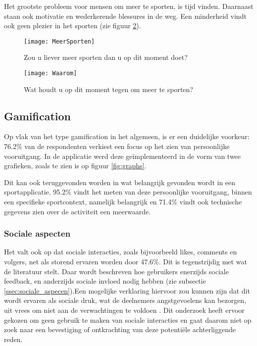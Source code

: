 Het grootste probleem voor mensen om meer te sporten, is tijd vinden. Daarnaast staan ook motivatie en wederkerende blessures in de weg. Een minderheid vindt ook geen plezier in het sporten (zie figuur \ref{fig:waarom}).

\begin{figure}[h]
    \caption[Zou u liever meer sporten dan u op dit moment doet?]{Zou u liever meer sporten dan u op dit moment doet?}
    \texttt{[image: MeerSporten]}
    \label{fig:meerBewegen}
\end{figure}

\begin{figure}[h]
    \caption[Wat houdt u op dit moment tegen om meer te sporten?]{Wat houdt u op dit moment tegen om meer te sporten?}
    \texttt{[image: Waarom]}
    \label{fig:waarom}
\end{figure}

\subsection{Gamification}

Op vlak van het type gamification in het algemeen, is er een duidelijke voorkeur: 76.2\% van de respondenten verkiest een focus op het zien van persoonlijke vooruitgang. In de applicatie werd deze geïmplementeerd in de vorm van twee grafieken, zoals te zien is op figuur \ref{fig:graphs}.

Dit kan ook teruggevonden worden in wat belangrijk gevonden wordt in een sportapplicatie. 95.2\% vindt het meten van deze persoonlijke vooruitgang, binnen een specifieke sportcontext, namelijk belangrijk en 71.4\% vindt ook technische gegevens zien over de activiteit een meerwaarde.

\subsubsection{Sociale aspecten}

Het valt ook op dat sociale interacties, zoals bijvoorbeeld likes, comments en volgers, net als storend ervaren worden door 47.6\%. Dit is tegenstrijdig met wat de literatuur stelt. Daar wordt beschreven hoe gebruikers enerzijds sociale feedback, en anderzijds sociale invloed nodig hebben (zie subsectie \ref{ssec:sociale_aspecen}).Een mogelijke verklaring hiervoor zou kunnen zijn dat dit wordt ervaren als sociale druk, wat de deelnemers angstgevoelens kan bezorgen, uit vrees om niet aan de verwachtingen te voldoen \autocite{Jong2010}. Dit onderzoek heeft ervoor gekozen om geen gebruik te maken van sociale interacties en gaat daarom niet op zoek naar een bevestiging of ontkrachting van deze potentiële achterliggende reden.

